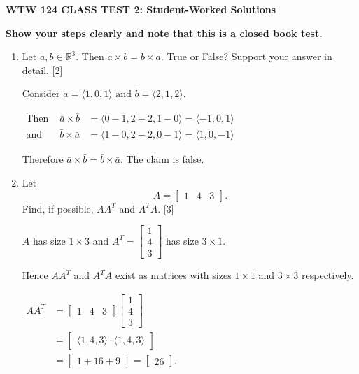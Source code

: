 \documentclass[11pt]{article}
\begin{document}
\begin{center}
    \textbf{\large WTW 124 \hfill CLASS TEST 2: Student-Worked Solutions}
\end{center}

\textbf{Show your steps clearly and note that this is a closed book test.}

\begin{enumerate}
    \item Let \(\bar{a},\bar{b} \in \mathbb{R}^3\). Then \(\bar{a}\times\bar{b} =\bar{b}\times\bar{a} \). True or False?
    Support your answer in detail. \hfill [2]
    
    \color{blue}
    Consider \(\bar{a} = \langle 1,0,1\rangle \text{ and } \bar{b} = \langle2,1,2\rangle\).

    \(
        \begin{aligned}
            \text{Then } &\bar{a}\times\bar{b} &=\langle0-1,2-2,1-0\rangle = \langle-1,0,1\rangle\\
            \text{and }   &\bar{b} \times \bar{a} &= \langle1-0,2-2,0-1\rangle = \langle1,0,-1\rangle
        \end{aligned}
    \)

    Therefore \(\bar{a}\times\bar{b} =\bar{b}\times\bar{a} \). The claim is false.
    \color{black}
    \item Let \[A = \begin{bmatrix} 1 & 4 & 3 \end{bmatrix}.\]
    Find, if possible, \(AA^T\) and \(A^TA\). \hfill [3]
    
    \color{blue}
    \(A\) has size \(1\times 3\) and \(A^T = \begin{bmatrix}
        1\\4\\3
    \end{bmatrix}\) has size \(3\times1\).

    Hence \(AA^T\) and \(A^TA\) exist as matrices with sizes \(1\times 1\) and \(3\times 3\) respectively.

    \(
        \begin{aligned}
            AA^T &= \begin{bmatrix} 1 & 4 & 3 \end{bmatrix}\begin{bmatrix}1\\4\\3\end{bmatrix}\\
                &= \begin{bmatrix}\langle1,4,3\rangle\cdot\langle1,4,3\rangle\end{bmatrix}\\
                &=  \begin{bmatrix}1+16+9\end{bmatrix} = \begin{bmatrix}26\end{bmatrix}.
        \end{aligned}
    \)


\end{enumerate}
\end{document}
